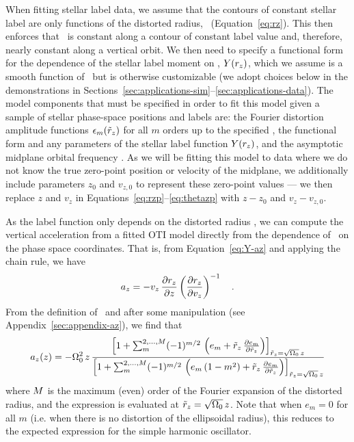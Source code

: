 When fitting stellar label data, we assume that the contours of constant stellar label
are only functions of the distorted radius, \rz\ (Equation~\ref{eq:rz}).
This then enforces that \rz\ is constant along a contour of constant label value and,
therefore, nearly constant along a vertical orbit.
We then need to specify a functional form for the dependence of the stellar label moment
on \rz, $Y(r_z)$, which we assume is a smooth function of \rz\ but is otherwise
customizable (we adopt choices below in the demonstrations in
Sections~\ref{sec:applications-sim}--\ref{sec:applications-data}).
The model components that must be specified in order to fit this model given a sample of
stellar phase-space positions and labels are: the Fourier distortion amplitude functions
$\epsilon_m(\tilde{r}_z)$ for all $m$ orders up to the specified \mmax, the functional form and
any parameters of the stellar label function $Y(r_z)$, and the asymptotic midplane
orbital frequency \freqzero.
As we will be fitting this model to data where we do not know the true zero-point
position or velocity of the midplane, we additionally include parameters $z_0$ and
$v_{z,0}$ to represent these zero-point values --- we then replace $z$ and $v_z$ in
Equations~\ref{eq:rzp}--\ref{eq:thetazp} with $z-z_0$ and $v_z - v_{z, 0}$.

As the label function only depends on the distorted radius \rz, we can compute the
vertical acceleration from a fitted OTI model directly from the dependence of \rz\ on
the phase space coordinates.
That is, from Equation~\ref{eq:Y-az} and applying the chain rule, we have
\begin{equation}
    a_z = - v_z \, \frac{\partial {r_z}}{\partial {z}} \left(\frac{\partial {r_z}}{\partial {v_z}}\right)^{-1} \quad .
    \label{eq:az-rz}
\end{equation}
From the definition of \rz\ and after some manipulation (see
Appendix~\ref{sec:appendix-az}), we find that
\begin{equation}
    a_z(z) = - \Omega_0^2 \, z \,
    \frac{\left[
        1 + \sum_{m}^{{2, \dots, M}} (-1)^{m/2} \,
            \left(e_m + \tilde{r}_z \, \frac{\partial e_m}{\partial \tilde{r}_z}\right)
    \right]_{\tilde{r}_z = \sqrt{\Omega_0}\,z}}{\left[
        1 + \sum_{m}^{{2, \dots, M}} (-1)^{m/2} \,
            \left(e_m\,(1 - m^2) + \tilde{r}_z \, \frac{\partial e_m}{\partial \tilde{r}_z}\right)
    \right]_{\tilde{r}_z = \sqrt{\Omega_0}\,z}} \label{eq:az-ugly}
\end{equation}
where $M$ is the maximum (even) order of the Fourier expansion of the distorted
radius, and the expression is evaluated at $\tilde{r}_z = \sqrt{\Omega_0}\,z$.
Note that when $e_m = 0$ for all $m$ (i.e. when there is no distortion of the
ellipsoidal radius), this reduces to the expected expression for the simple harmonic
oscillator.

